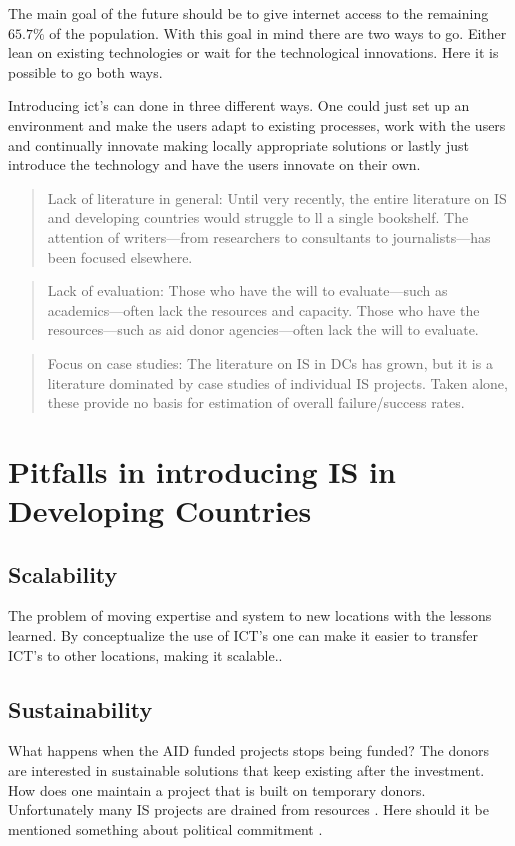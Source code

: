 The main goal of the future should be to give internet access to the remaining $65.7\%$ of the population.
With this goal in mind there are two ways to go. Either lean on existing technologies or wait for the technological innovations.
Here it is possible to go both ways. 

Introducing \gls{ict}'s can done in three different ways.
One could just set up an environment and make the users adapt to existing processes, work with the users and continually innovate making locally appropriate solutions or lastly just introduce the technology and have the users innovate on their own. 

\cite{internet:stats}
\cite{icd4d:rh}


\begin{quotation}
Lack of literature in general: Until very recently,
the entire literature on IS and developing countries
would struggle to ll a single bookshelf. The
attention of writers—from researchers to consultants
to journalists—has been focused elsewhere.\cite{rh:isdc}
\end{quotation}
\begin{quotation}
Lack of evaluation: Those who have the will to
evaluate—such as academics—often lack the
resources and capacity. Those who have the
resources—such as aid donor agencies—often
lack the will to evaluate.\cite{rh:isdc}
\end{quotation}
\begin{quotation}
Focus on case studies: The literature on IS in
DCs has grown, but it is a literature dominated by
case studies of individual IS projects. Taken alone,
these provide no basis for estimation of overall
failure/success rates.\cite{rh:isdc}
\end{quotation}

\section{Pitfalls in introducing IS in Developing Countries}
\subsection{Scalability}
The problem of moving expertise and system to new locations with the lessons learned.
By conceptualize the use of ICT's one can make it easier to transfer ICT's to other locations, making it scalable.\cite{jbemss:noa}.
\subsection{Sustainability}
What happens when the AID funded projects stops being funded? The donors are interested in sustainable solutions that keep existing after the investment.
How does one maintain a project that is built on temporary donors. Unfortunately many IS projects are drained from resources \cite{ca:isdc}.
Here should it be mentioned something about political commitment \cite{jbemss:noa}.  

